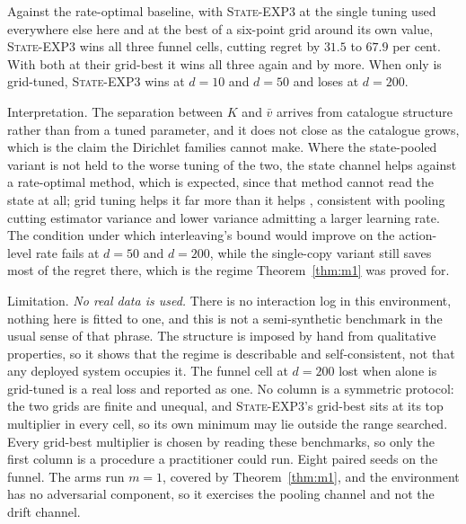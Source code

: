 \documentclass{article}
\theoremstyle{remark}
\newcommand{\vhat}{\widehat{\bar v}}
\begin{document}
Against the rate-optimal baseline, with \textsc{State-EXP3} at the single tuning used everywhere
else here and \citet{zimmert2020} at the best of a six-point grid around its own value,
\textsc{State-EXP3} wins all three funnel cells, cutting regret by $31.5$ to $67.9$ per cent. With
both at their grid-best it wins all three again and by more. When only \citet{zimmert2020} is
grid-tuned, \textsc{State-EXP3} wins at $d=10$ and $d=50$ and loses at $d=200$.

Interpretation. The separation between $K$ and $\vhat$ arrives from catalogue structure rather than
from a tuned parameter, and it does not close as the catalogue grows, which is the claim the
Dirichlet families cannot make. Where the state-pooled variant is not held to the worse tuning of
the two, the state channel helps against a rate-optimal method, which is expected, since that
method cannot read the state at all; grid tuning helps it far more than it helps
\citet{zimmert2020}, consistent with pooling cutting estimator variance and lower variance
admitting a larger learning rate. The condition under which interleaving's bound would improve on
the action-level rate fails at $d=50$ and $d=200$, while the single-copy variant still saves most
of the regret there, which is the regime Theorem~\ref{thm:m1} was proved for.

Limitation. \emph{No real data is used.} There is no interaction log in this environment, nothing
here is fitted to one, and this is not a semi-synthetic benchmark in the usual sense of that
phrase. The structure is imposed by hand from qualitative properties, so it shows that the regime
is describable and self-consistent, not that any deployed system occupies it. The funnel cell at
$d=200$ lost when \citet{zimmert2020} alone is grid-tuned is a real loss and reported as one. No column is
a symmetric protocol: the two grids are finite and unequal, and \textsc{State-EXP3}'s grid-best
sits at its top multiplier in every cell, so its own minimum may lie outside the range searched.
Every grid-best multiplier is chosen by reading these benchmarks, so only the first column is a
procedure a practitioner could run. Eight paired seeds on the funnel.
The arms run $m=1$, covered by Theorem~\ref{thm:m1}, and the environment has no adversarial
component, so it exercises the pooling channel and not the drift channel.
\end{document}
